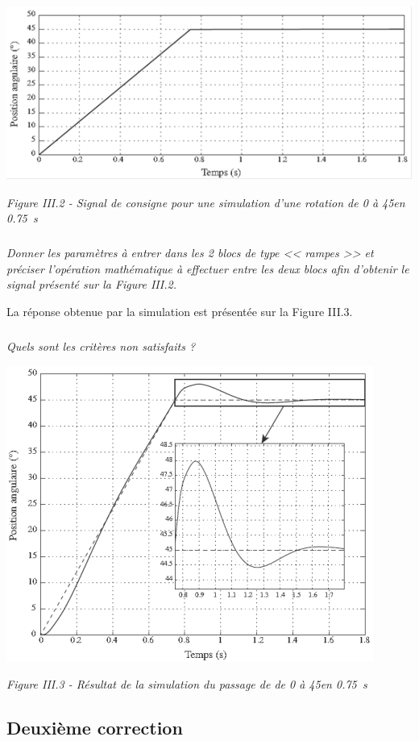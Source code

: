 \documentclass[10pt,fleqn]{article} %
\begin{document}
\begin{multicols}{2}
\begin{center}
\includegraphics[width=.6\linewidth]{images/pt_07} 

\textit{Figure III.2 - Signal de consigne pour une simulation d'une rotation de 0 à 45\degres en \SI{0,75}{s}}
\end{center}



\subparagraph{}
\textit{Donner les paramètres à entrer dans les 2 blocs de type << rampes >> et préciser l'opération mathématique à effectuer entre les deux blocs afin d'obtenir le signal présenté sur la Figure III.2.}
\ifprof
\begin{corrige}
\end{corrige}
\else
\fi

La réponse obtenue par la simulation est présentée sur la Figure III.3.

\subparagraph{}
\textit{Quels sont les critères non satisfaits ?}
\ifprof
\begin{corrige}
\end{corrige}
\else
\fi



\begin{center}
\includegraphics[width=.5\linewidth]{images/pt_08} 

\textit{Figure III.3 - Résultat de la simulation du passage de de 0 à 45\degres en \SI{0,75}{s}}
\end{center}


\subsection*{Deuxième correction}


\end{multicols}
\end{document}
